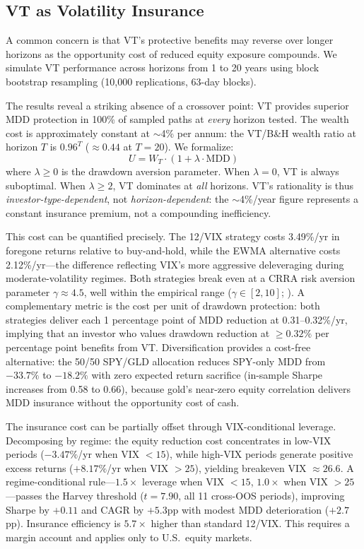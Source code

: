 \subsection{VT as Volatility Insurance}
\label{sec:vt_insurance}

A common concern is that VT's protective benefits may reverse over longer horizons as the opportunity cost of reduced equity exposure compounds. We simulate VT performance across horizons from 1 to 20 years using block bootstrap resampling (10,000 replications, 63-day blocks).

The results reveal a striking absence of a crossover point: VT provides superior MDD protection in 100\% of sampled paths at \textit{every} horizon tested. The wealth cost is approximately constant at $\sim$4\% per annum: the VT/B\&H wealth ratio at horizon $T$ is $0.96^T$ ($\approx 0.44$ at $T = 20$). We formalize:
\begin{equation}
U = W_T \cdot (1 + \lambda \cdot \text{MDD})
\label{eq:mdd_utility}
\end{equation}
where $\lambda \geq 0$ is the drawdown aversion parameter. When $\lambda = 0$, VT is always suboptimal. When $\lambda \geq 2$, VT dominates at \textit{all} horizons. VT's rationality is thus \textit{investor-type-dependent}, not \textit{horizon-dependent}: the $\sim$4\%/year figure represents a constant insurance premium, not a compounding inefficiency.

This cost can be quantified precisely. The 12/VIX strategy costs 3.49\%/yr in foregone returns relative to buy-and-hold, while the EWMA alternative costs 2.12\%/yr---the difference reflecting VIX's more aggressive deleveraging during moderate-volatility regimes. Both strategies break even at a CRRA risk aversion parameter $\gamma \approx 4.5$, well within the empirical range ($\gamma \in [2, 10]$; \citealt{cederburg2020}). A complementary metric is the cost per unit of drawdown protection: both strategies deliver each 1 percentage point of MDD reduction at 0.31--0.32\%/yr, implying that an investor who values drawdown reduction at $\geq 0.32\%$ per percentage point benefits from VT. Diversification provides a cost-free alternative: the 50/50 SPY/GLD allocation reduces SPY-only MDD from $-33.7\%$ to $-18.2\%$ with zero expected return sacrifice (in-sample Sharpe increases from 0.58 to 0.66), because gold's near-zero equity correlation delivers MDD insurance without the opportunity cost of cash.

The insurance cost can be partially offset through VIX-conditional leverage. Decomposing by regime: the equity reduction cost concentrates in low-VIX periods ($-3.47\%$/yr when VIX $< 15$), while high-VIX periods generate positive excess returns ($+8.17\%$/yr when VIX $> 25$), yielding breakeven VIX $\approx 26.6$. A regime-conditional rule---$1.5\times$ leverage when VIX $< 15$, $1.0\times$ when VIX $> 25$---passes the Harvey threshold ($t = 7.90$, all 11 cross-OOS periods), improving Sharpe by $+0.11$ and CAGR by $+5.3$pp with modest MDD deterioration ($+2.7$pp). Insurance efficiency is $5.7\times$ higher than standard 12/VIX. This requires a margin account and applies only to U.S.\ equity markets.

